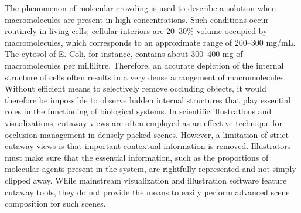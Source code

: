 The phenomenon of molecular crowding is used to describe a solution when macromolecules are present in high concentrations.
Such conditions occur routinely in living cells; cellular interiors are 20–30\% volume-occupied by macromolecules, which corresponds to an approximate range of 200–300 mg/mL.
The cytosol of E. Coli, for instance, contains about 300–400 mg of macromolecules per millilitre.
Therefore, an accurate depiction of the internal structure of cells often results in a very dense arrangement of macromolecules. %
Without efficient means to selectively remove occluding objects, it would therefore be impossible to observe hidden internal structures that play essential roles in the functioning of biological systems.
In scientific illustrations and visualizations, cutaway views are often employed as an effective technique for occlusion management in densely packed scenes.
However, a limitation of strict cutaway views is that important contextual information is removed.
Illustrators must make sure that the essential information, such as the proportions of molecular agents present in the system, are rightfully represented and not simply clipped away.
While mainstream visualization and illustration software feature cutaway tools, they do not provide the means to easily perform advanced scene composition for such scenes.

